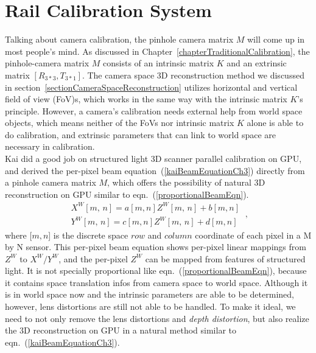 \section{Rail Calibration System}
\label{sectionRailCalibrationSystem}
Talking about camera calibration, the pinhole camera matrix \(M\) will come up in most people's mind. As discussed in Chapter~\ref{chapterTraditionalCalibration}, the pinhole-camera matrix \(M\) consists of an intrinsic matrix \(K\) and an extrinsic matrix \([R_{3*3}, T_{3*1}]\). The camera space 3D reconstruction method we discussed in section~\ref{sectionCameraSpaceReconstruction} utilizes horizontal and vertical field of view (FoV)s, which works in the same way with the intrinsic matrix \(K\)'s principle. However, a camera's calibration needs external help from world space objects, which means neither of the FoVs nor intrinsic matrix \(K\) alone is able to do calibration,  and extrinsic parameters that can link to world space are necessary in calibration. 
\\\indent
Kai \cite{Kai10} did a good job on structured light 3D scanner parallel calibration on GPU, and derived the per-pixel beam equation~(\ref{kaiBeamEquationCh3}) directly from a pinhole camera matrix \(M\), which offers the possibility of natural 3D reconstruction on GPU similar to eqn.~(\ref{proportionalBeamEqn}).
%
\begin{equation}
\begin{aligned}
X^W[m,\,  n] = a[m, n]Z^W[m,\,  n]+b[m, n]
\\%
Y^W[m,\,  n] = c[m, n]Z^W[m,\,  n]+d[m, n]
\end{aligned} \ ,
\label{kaiBeamEquationCh3}
\end{equation}%
\noindent
where [\(m,n\)] is the discrete space \(row\) and \(column\) coordinate of each pixel in a M by N sensor. This per-pixel beam equation shows per-pixel linear mappings from \(Z^W\) to \(X^W/Y^W\), and the per-pixel \(Z^W\) can be mapped from features of structured light. It is not specially proportional like eqn.~(\ref{proportionalBeamEqn}), because it contains space translation infos from camera space to world space. Although it is in world space now and the intrinsic parameters are able to be determined, however, lens distortions are still not able to be handled. To make it ideal, we need to not only remove the lens distortions and \emph{depth distortion}, but also realize the 3D reconstruction on GPU in a natural method similar to eqn.~(\ref{kaiBeamEquationCh3}).
